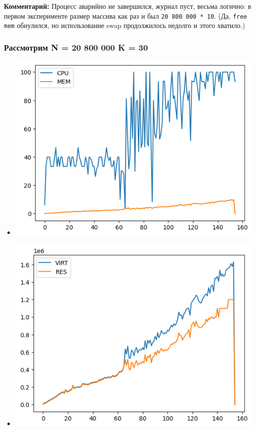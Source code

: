 \documentclass[10pt, a4paper]{article}
\begin{document}
\textbf{Комментарий: }
Процесс аварийно не завершился, журнал пуст, весьма логично: в первом эксперименте размер массива как раз и был \texttt{20 800 000 * 10}. (Да, \texttt{free mem} обнулился, но использование swap продолжилось недолго и этого хватило.)

\subsubsection*{Рассмотрим \textbf{N = 20 800 000} \textbf{K = 30}}

\begin{itemize}
    \item \includegraphics[scale=0.8]{graphs/14.png}
    \item \includegraphics[scale=0.8]{graphs/15.png}

\end{itemize}
\end{document}
